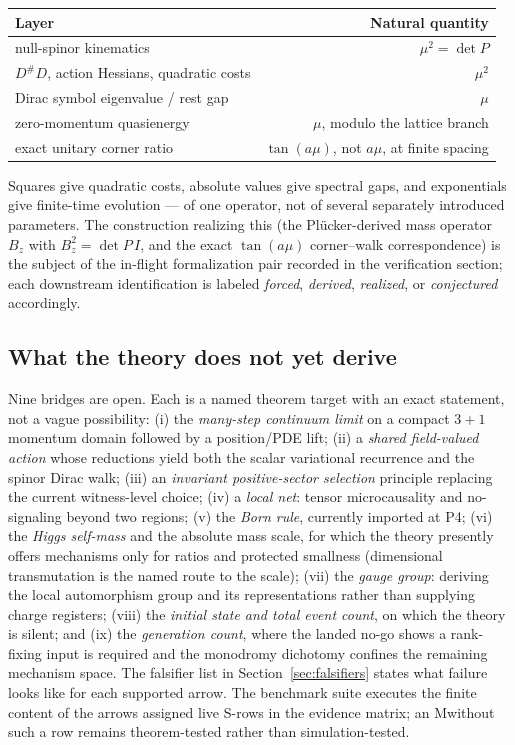 \documentclass[11pt]{article}
\newcommand{\Mtag}{\textcolor{verified}{\textsc{M}}}
\begin{document}
\begin{center}
\small
\begin{tabular}{@{}lr@{}}
\toprule
Layer & Natural quantity\\
\midrule
null-spinor kinematics & $\mu^2=\det P$\\
$D^{\#}D$, action Hessians, quadratic costs & $\mu^2$\\
Dirac symbol eigenvalue / rest gap & $\mu$\\
zero-momentum quasienergy & $\mu$, modulo the lattice branch\\
exact unitary corner ratio & $\tan(a\mu)$, not $a\mu$, at finite spacing\\
\bottomrule
\end{tabular}
\end{center}

Squares give quadratic costs, absolute values give spectral gaps, and
exponentials give finite-time evolution --- of one operator, not of several
separately introduced parameters.  The construction realizing this
(the Pl\"ucker-derived mass operator $B_z$ with $B_z^2=\det P\,I$, and the
exact $\tan(a\mu)$ corner--walk correspondence) is the subject of the
in-flight formalization pair recorded in the verification section; each
downstream identification is labeled \emph{forced}, \emph{derived},
\emph{realized}, or \emph{conjectured} accordingly.

\subsection{What the theory does not yet derive}

Nine bridges are open.  Each is a named theorem target with an exact
statement, not a vague possibility: (i) the \emph{many-step continuum limit}
on a compact $3+1$ momentum domain followed by a position/PDE lift;
(ii) a \emph{shared field-valued action} whose reductions yield both the
scalar variational recurrence and the spinor Dirac walk; (iii) an
\emph{invariant positive-sector selection} principle replacing the current
witness-level choice; (iv) a \emph{local net}: tensor microcausality and
no-signaling beyond two regions; (v) the \emph{Born rule}, currently imported
at P4; (vi) the \emph{Higgs self-mass} and the absolute mass scale, for which the
theory presently offers mechanisms only for ratios and protected smallness
(dimensional transmutation is the named route to the scale);
(vii) the \emph{gauge group}: deriving the local automorphism group and its
representations rather than supplying charge registers; (viii) the
\emph{initial state and total event count}, on which the theory is silent;
and (ix) the \emph{generation count}, where the landed no-go shows a
rank-fixing input is required and the monodromy dichotomy confines the
remaining mechanism space.  The
falsifier list in Section~\ref{sec:falsifiers} states what failure looks like
for each supported arrow.  The benchmark suite executes the finite content of
the arrows assigned live S-rows in the evidence matrix; an \Mtag without such
a row remains theorem-tested rather than simulation-tested.
\end{document}
